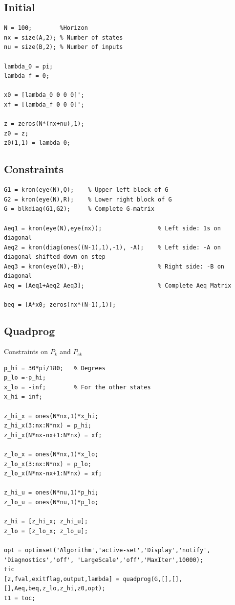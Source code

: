 \documentclass[11pt,a4paper,USenglish]{article} %
\begin{document}
\subsection*{Initial}

\begin{verbatim}
N = 100;        %Horizon
nx = size(A,2); % Number of states
nu = size(B,2); % Number of inputs

lambda_0 = pi;
lambda_f = 0;

x0 = [lambda_0 0 0 0]';
xf = [lambda_f 0 0 0]';

z = zeros(N*(nx+nu),1);
z0 = z;
z0(1,1) = lambda_0;
\end{verbatim}


\subsection*{Constraints}

\begin{verbatim}
G1 = kron(eye(N),Q);    % Upper left block of G
G2 = kron(eye(N),R);    % Lower right block of G
G = blkdiag(G1,G2);     % Complete G-matrix

Aeq1 = kron(eye(N),eye(nx));                % Left side: 1s on diagonal
Aeq2 = kron(diag(ones((N-1),1),-1), -A);    % Left side: -A on diagonal shifted down on step
Aeq3 = kron(eye(N),-B);                     % Right side: -B on diagonal
Aeq = [Aeq1+Aeq2 Aeq3];                     % Complete Aeq Matrix

beq = [A*x0; zeros(nx*(N-1),1)];
\end{verbatim}


\subsection*{Quadprog}

\begin{par}
Constraints on $P_{k}$ and $P_{ck}$ 
\end{par} \vspace{1em}
\begin{verbatim}
p_hi = 30*pi/180;   % Degrees
p_lo =-p_hi;
x_lo = -inf;        % For the other states
x_hi = inf;

z_hi_x = ones(N*nx,1)*x_hi;
z_hi_x(3:nx:N*nx) = p_hi;
z_hi_x(N*nx-nx+1:N*nx) = xf;

z_lo_x = ones(N*nx,1)*x_lo;
z_lo_x(3:nx:N*nx) = p_lo;
z_lo_x(N*nx-nx+1:N*nx) = xf;

z_hi_u = ones(N*nu,1)*p_hi;
z_lo_u = ones(N*nu,1)*p_lo;

z_hi = [z_hi_x; z_hi_u];
z_lo = [z_lo_x; z_lo_u];

opt = optimset('Algorithm','active-set','Display','notify', 'Diagnostics','off', 'LargeScale','off','MaxIter',10000);
tic
[z,fval,exitflag,output,lambda] = quadprog(G,[],[],[],Aeq,beq,z_lo,z_hi,z0,opt);
t1 = toc;
\end{verbatim}
\end{document}
